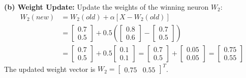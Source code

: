 \documentclass[12pt,a4paper]{article}
\begin{document}
\begin{tcolorbox}[examplebox, title={Kohonen SOM Winning Neuron and Weight Update}]
\par\vspace{4pt}
\textbf{(b) Weight Update:}
Update the weights of the winning neuron $W_2$:
\begin{align*}
  W_2(new) &= W_2(old) + \alpha [X - W_2(old)] \\
  &= \begin{bmatrix} 0.7 \\ 0.5 \end{bmatrix} + 0.5 \left( \begin{bmatrix} 0.8 \\ 0.6 \end{bmatrix} - \begin{bmatrix} 0.7 \\ 0.5 \end{bmatrix} \right) \\
  &= \begin{bmatrix} 0.7 \\ 0.5 \end{bmatrix} + 0.5 \begin{bmatrix} 0.1 \\ 0.1 \end{bmatrix} = \begin{bmatrix} 0.7 \\ 0.5 \end{bmatrix} + \begin{bmatrix} 0.05 \\ 0.05 \end{bmatrix} = \begin{bmatrix} 0.75 \\ 0.55 \end{bmatrix}
\end{align*}
The updated weight vector is $W_2 = \begin{bmatrix} 0.75 & 0.55 \end{bmatrix}^T$.
\end{tcolorbox}
\end{document}
